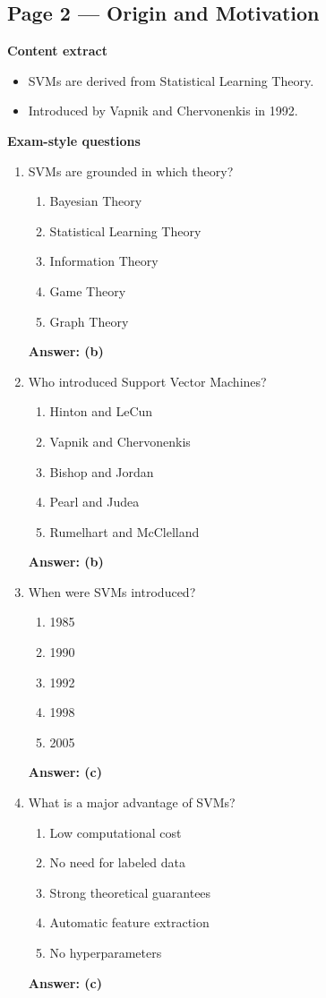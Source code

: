 \documentclass[12pt]{article}
\begin{document}
\subsection*{Page 2 — Origin and Motivation}

\textbf{Content extract}
\begin{itemize}
	\item SVMs are derived from Statistical Learning Theory.
	\item Introduced by Vapnik and Chervonenkis in 1992.
\end{itemize}

\textbf{Exam-style questions}

\begin{enumerate}
	\item SVMs are grounded in which theory?
	\begin{enumerate}
		\item Bayesian Theory
		\item Statistical Learning Theory
		\item Information Theory
		\item Game Theory
		\item Graph Theory
	\end{enumerate}
	\textbf{Answer: (b)}
	
	\item Who introduced Support Vector Machines?
	\begin{enumerate}
		\item Hinton and LeCun
		\item Vapnik and Chervonenkis
		\item Bishop and Jordan
		\item Pearl and Judea
		\item Rumelhart and McClelland
	\end{enumerate}
	\textbf{Answer: (b)}
	
	\item When were SVMs introduced?
	\begin{enumerate}
		\item 1985
		\item 1990
		\item 1992
		\item 1998
		\item 2005
	\end{enumerate}
	\textbf{Answer: (c)}
	
	\item What is a major advantage of SVMs?
	\begin{enumerate}
		\item Low computational cost
		\item No need for labeled data
		\item Strong theoretical guarantees
		\item Automatic feature extraction
		\item No hyperparameters
	\end{enumerate}
	\textbf{Answer: (c)}
	

\end{enumerate}
\end{document}
